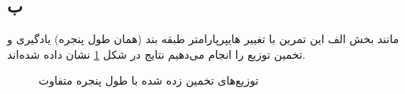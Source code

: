 \documentclass[12pt,onecolumn,a4paper]{article}
\begin{document}
\subsection*{ب}
مانند بخش الف این تمرین با تغییر هایپرپارامتر طبقه بند (همان طول پنجره) یادگیری و تخمین توزیع را انجام می‌دهیم نتایج در شکل \ref{fig:6} نشان داده شده‌اند.
\begin{figure}[h]
    \centering
    \caption{توزیع‌های تخمین زده شده با طول پنجره متفاوت}
    \label{fig:6}
\end{figure}
\end{document}
